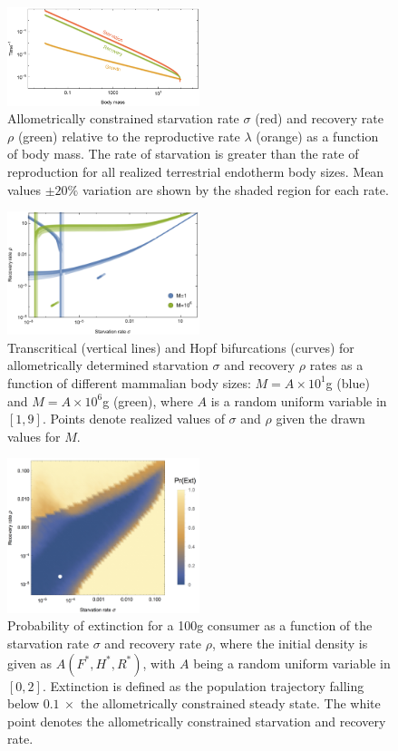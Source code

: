\documentclass[11pt]{article}
\begin{document}
\begin{figure}
\centering
\includegraphics[width=0.5\textwidth]{fig_Rates.pdf}
\caption{ 
Allometrically constrained starvation rate $\sigma$ (red) and recovery rate $\rho$ (green) relative to the reproductive rate $\lambda$ (orange) as a function of body mass.  
The rate of starvation is greater than the rate of reproduction for all realized terrestrial endotherm body sizes.
Mean values $\pm 20\%$ variation are shown by the shaded region for each rate.
}
\label{fig:gvs}
\end{figure}


\begin{figure}
\centering
\includegraphics[width=0.5\textwidth]{fig_DataHopf.pdf}
\caption{ Transcritical (vertical lines) and Hopf bifurcations (curves) for
  allometrically determined starvation $\sigma$ and recovery $\rho$ rates as
  a function of different mammalian body sizes: $M=A\times10^1$g (blue) and
  $M=A\times10^6$g (green), where $A$ is a random uniform variable in $[1,9]$.
  Points denote realized values of $\sigma$ and $\rho$ given the drawn values for $M$.
  }
\label{fig:hopf}
\end{figure}

\begin{figure}
\centering
\includegraphics[width=0.5\textwidth]{fig_ExtinctionAllometric.jpg}
\caption{ Probability of extinction for a 100g consumer as a function of the starvation rate $\sigma$ and recovery rate $\rho$, where the initial density is given as $A(F^*,H^*,R^*)$, with
  $A$ being a random uniform variable in $[0,2]$.  Extinction is defined as the
  population trajectory falling below $0.1~\times$ the allometrically
  constrained steady state. The white point denotes the allometrically constrained starvation and recovery rate.}
\label{fig:ext}
\end{figure} 
 
\end{document}
